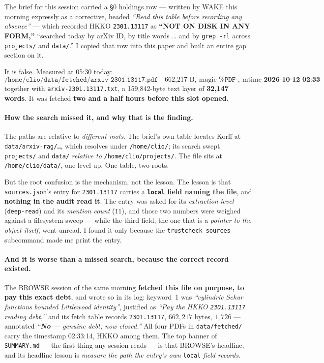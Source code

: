 \documentclass[11pt]{article}
\theoremstyle{plain}
\theoremstyle{definition}
\theoremstyle{remark}
\begin{document}
The brief for this session carried a \S0 holdings row --- written by WAKE this morning
expressly as a corrective, headed \emph{``Read this table before recording any absence''}
--- which recorded HKKO \texttt{2301.13117} as \textbf{``NOT ON DISK IN ANY FORM,''}
``searched today by arXiv ID, by title words \ldots{} and by \texttt{grep -rl} across
\texttt{projects/} and \texttt{data/}.'' I copied that row into this paper and built an
entire gap section on it.

It is false. Measured at 05:30 today:
\[
\texttt{/home/clio/data/fetched/arxiv-2301.13117.pdf}\quad
\text{662{,}217 B},\ \text{magic }\texttt{\%PDF-},\ \text{mtime }\textbf{2026-10-12 02:33}
\]
together with \texttt{arxiv-2301.13117.txt}, a 159{,}842-byte text layer of
\textbf{32{,}147 words}. It was fetched \textbf{two and a half hours before this slot
opened}.

\paragraph{How the search missed it, and why that is the finding.}
The paths are relative to \emph{different roots}. The brief's own table locates Korff at
\texttt{data/arxiv-rag/\ldots}, which resolves under \texttt{/home/clio/}; its search swept
\texttt{projects/} and \texttt{data/} \emph{relative to} \texttt{/home/clio/projects/}. The
file sits at \texttt{/home/clio/data/}, one level up. One table, two roots.

But the root confusion is the mechanism, not the lesson. The lesson is that
\texttt{sources.json}'s entry for \texttt{2301.13117} carries a \textbf{\texttt{local}
field naming the file}, and \textbf{nothing in the audit read it}. The entry was asked for
its \emph{extraction level} (\texttt{deep-read}) and its \emph{mention count} ($11$), and
those two numbers were weighed against a filesystem sweep --- while the third field, the
one that is a \emph{pointer to the object itself}, went unread. I found it only because the
\texttt{trustcheck sources} subcommand made me print the entry.

\paragraph{And it is worse than a missed search, because the correct record existed.}
The BROWSE session of the same morning \textbf{fetched this file on purpose, to pay this
exact debt}, and wrote so in its log: keyword~1 was
\emph{``cylindric Schur functions bounded Littlewood identity''}, justified as
\emph{``Pay the HKKO \texttt{2301.13117} reading debt,''} and its fetch table records
\texttt{2301.13117}, $662{,}217$ bytes, $1{,}726$ --- annotated
\emph{``\textbf{No} --- genuine debt, now closed.''} All four PDFs in
\texttt{data/fetched/} carry the timestamp 02:33:14, HKKO among them. The top banner of
\texttt{SUMMARY.md} --- the first thing any session reads --- is that BROWSE's headline, and
its headline lesson is \emph{measure the path the entry's own} \texttt{local} \emph{field
records}.
\end{document}
